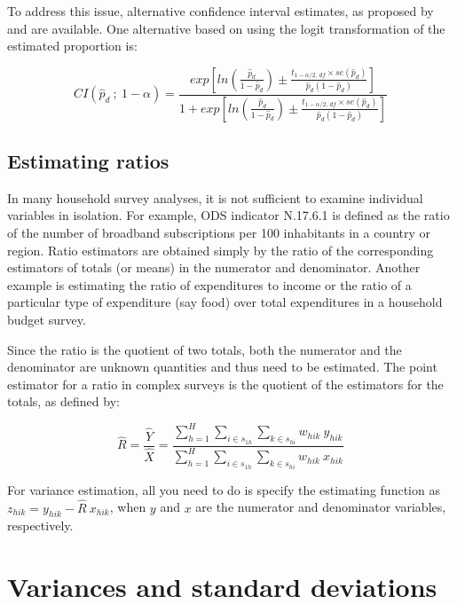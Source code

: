 \documentclass[
  12pt,
]{book}
\begin{document}
To address this issue, alternative confidence interval estimates, as proposed by \citet{Rust2007ConfidenceIF} and \citet{DeanPagano2015} are available. One alternative based on using the logit transformation of the estimated proportion is:

\[
CI \left( \widehat{p}_d \ ; \ 1 - \alpha \right) = \frac {exp \left[ ln \left( \frac{\widehat{p}_d} {1 - \widehat{p}_d} \right) \pm \frac{t_{1-\alpha/2 , \, df} \times se \left( \widehat{p}_d \right)} {\widehat{p}_d \left( 1 - \widehat{p}_d \right) } \right]} {1 + exp \left[ ln \left( \frac{\widehat{p}_d} {1 - \widehat{p}_d} \right) \pm \frac{t_{1-\alpha/2, \, df} \times se \left( \widehat{p}_d \right)} {\widehat{p}_d \left( 1 - \widehat{p}_d \right)}\right]}
\]

\subsection{Estimating ratios}\label{estimating-ratios}

In many household survey analyses, it is not sufficient to examine individual variables in isolation. For example, ODS indicator N.17.6.1 is defined as the ratio of the number of broadband subscriptions per 100 inhabitants in a country or region. Ratio estimators are obtained simply by the ratio of the corresponding estimators of totals (or means) in the numerator and denominator. Another example is estimating the ratio of expenditures to income or the ratio of a particular type of expenditure (say food) over total expenditures in a household budget survey.

Since the ratio is the quotient of two totals, both the numerator and the denominator are unknown quantities and thus need to be estimated. The point estimator for a ratio in complex surveys is the quotient of the estimators for the totals, as defined by:

\[
\widehat{R} = \frac{\widehat{Y}}{\widehat{X}}
= \frac{\sum_{h=1}^{H}\sum_{i \in s_{1h}} \sum_{ k \in s_{hi}}  w_{hik} \ y_{hik}}{\sum_{h=1}^{H}\sum_{i \in s_{1h}} \sum_{ k \in s_{hi}}  w_{hik} \ x_{hik}}
\]

For variance estimation, all you need to do is specify the estimating function as \(z_{hik} = y_{hik} - \widehat{R} \ x_{hik}\), when \(y\) and \(x\) are the numerator and denominator variables, respectively.

\section{Variances and standard deviations}\label{variances-and-standard-deviations}
\end{document}
